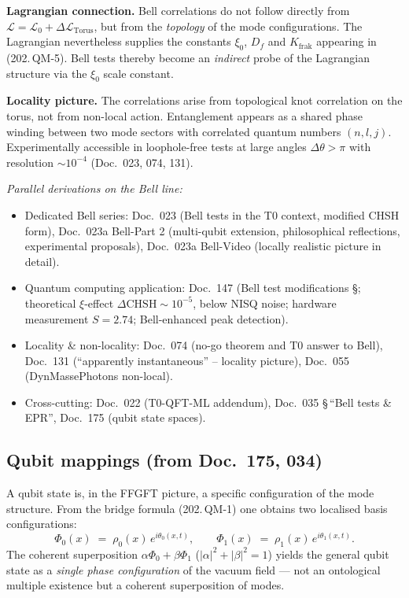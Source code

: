 \textbf{Lagrangian connection.} Bell correlations do not follow
directly from $\mathcal{L} = \mathcal{L}_0 + \Delta\mathcal{L}_{\text{Torus}}$,
but from the \emph{topology} of the mode configurations. The
Lagrangian nevertheless supplies the constants
$\xi_0$, $D_f$ and $K_{\text{frak}}$ appearing in (202.\,QM-5).
Bell tests thereby become an \emph{indirect} probe of the Lagrangian
structure via the $\xi_0$ scale constant.

\textbf{Locality picture.} The correlations arise from topological
knot correlation on the torus, not from non-local action. Entanglement
appears as a shared phase winding between two mode sectors with
correlated quantum numbers $(n,l,j)$. Experimentally accessible in
loophole-free tests at large angles $\Delta\theta > \pi$ with
resolution $\sim 10^{-4}$ (Doc.~023, 074, 131).

\textit{Parallel derivations on the Bell line:}
\begin{itemize}\setlength\itemsep{0pt}
  \item Dedicated Bell series:
        Doc.~023 (Bell tests in the T0 context, modified CHSH form),
        Doc.~023a Bell-Part 2 (multi-qubit extension, philosophical
        reflections, experimental proposals),
        Doc.~023a Bell-Video (locally realistic picture in detail).
  \item Quantum computing application:
        Doc.~147 (Bell test modifications \S; theoretical
        $\xi$-effect $\Delta\mathrm{CHSH} \sim 10^{-5}$, below
        NISQ noise; hardware measurement $S=2.74$; Bell-enhanced peak
        detection).
  \item Locality \& non-locality:
        Doc.~074 (no-go theorem and T0 answer to Bell),
        Doc.~131 (\enquote{apparently instantaneous} -- locality picture),
        Doc.~055 (DynMassePhotons non-local).
  \item Cross-cutting:
        Doc.~022 (T0-QFT-ML addendum),
        Doc.~035 \S\,\enquote{Bell tests \& EPR},
        Doc.~175 (qubit state spaces).
\end{itemize}

\subsection*{Qubit mappings (from Doc.~175, 034)}

A qubit state is, in the FFGFT picture, a specific configuration of
the mode structure. From the bridge formula (202.\,QM-1) one obtains
two localised basis configurations:
\begin{equation}
  \Phi_0(x) \;=\; \rho_0(x)\,e^{i\theta_0(x,t)},
  \qquad
  \Phi_1(x) \;=\; \rho_1(x)\,e^{i\theta_1(x,t)}.
  \tag{202.\,QM-7}
\end{equation}
The coherent superposition
$\alpha\Phi_0 + \beta\Phi_1$ ($|\alpha|^2 + |\beta|^2 = 1$) yields the
general qubit state as a \emph{single phase configuration} of the
vacuum field --- not an ontological multiple existence but a coherent
superposition of modes.

